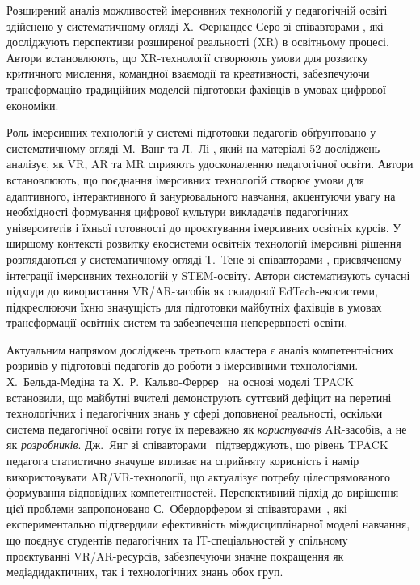 Розширений аналіз можливостей імерсивних технологій у педагогічній освіті здійснено у систематичному огляді Х.~Фернандес-Серо зі співавторами \cite{Malytska2022EU}, які досліджують перспективи розширеної реальності (XR) в освітньому процесі. Автори встановлюють, що XR-технології створюють умови для розвитку критичного мислення, командної взаємодії та креативності, забезпечуючи трансформацію традиційних моделей підготовки фахівців в умовах цифрової економіки.

Роль імерсивних технологій у системі підготовки педагогів обґрунтовано у систематичному огляді М.~Ванг та Л.~Лі \cite{Angelov2025Synergy}, який на матеріалі 52 досліджень аналізує, як VR, AR та MR сприяють удосконаленню педагогічної освіти. Автори встановлюють, що поєднання імерсивних технологій створює умови для адаптивного, інтерактивного й занурювального навчання, акцентуючи увагу на необхідності формування цифрової культури викладачів педагогічних університетів і їхньої готовності до проєктування імерсивних освітніх курсів. У ширшому контексті розвитку екосистеми освітніх технологій імерсивні рішення розглядаються у систематичному огляді Т.~Тене зі співавторами \cite{Medvedieva2024STEAM}, присвяченому інтеграції імерсивних технологій у STEM-освіту. Автори систематизують сучасні підходи до використання VR/AR-засобів як складової EdTech-екосистеми, підкреслюючи їхню значущість для підготовки майбутніх фахівців в умовах трансформації освітніх систем та забезпечення неперервності освіти.

Актуальним напрямом досліджень третього кластера є аналіз компетентнісних розривів у підготовці педагогів до роботи з імерсивними технологіями. Х.~Бельда-Медіна та Х.~Р.~Кальво-Феррер~\cite{BeldaMedina2022TPACK} на основі моделі TPACK встановили, що майбутні вчителі демонструють суттєвий дефіцит на перетині технологічних і педагогічних знань у сфері доповненої реальності, оскільки система педагогічної освіти готує їх переважно як \emph{користувачів} AR-засобів, а не як \emph{розробників}. Дж.~Янг зі співавторами~\cite{Jang2021TAM} підтверджують, що рівень TPACK педагога статистично значуще впливає на сприйняту корисність і намір використовувати AR/VR-технології, що актуалізує потребу цілеспрямованого формування відповідних компетентностей. Перспективний підхід до вирішення цієї проблеми запропоновано С.~Обердорфером зі співавторами~\cite{Oberdorfer2021Interdisciplinary}, які експериментально підтвердили ефективність міждисциплінарної моделі навчання, що поєднує студентів педагогічних та ІТ-спеціальностей у спільному проєктуванні VR/AR-ресурсів, забезпечуючи значне покращення як медіадидактичних, так і технологічних знань обох груп.

